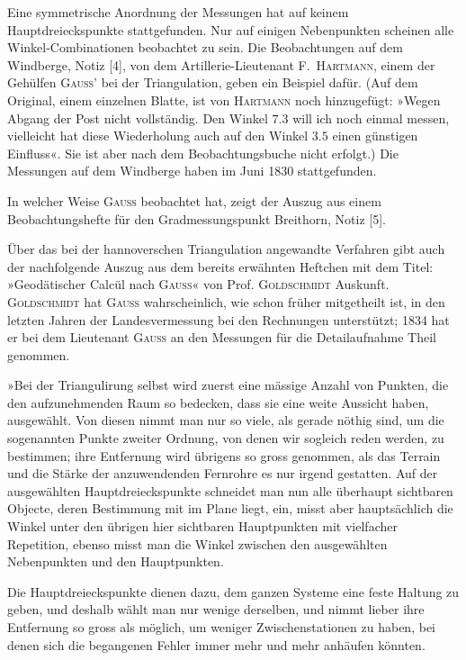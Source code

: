 Eine symmetrische Anordnung der Messungen hat auf keinem Hauptdreieckspunkte stattgefunden. Nur auf einigen Nebenpunkten scheinen alle Winkel-Combinationen beobachtet zu sein. Die Beobachtungen auf dem Windberge, Notiz [4], von dem Artillerie-Lieutenant F.~\textsc{Hartmann}, einem der Gehülfen \textsc{Gauss}' bei der Triangulation, geben ein Beispiel dafür. (Auf dem Original, einem einzelnen Blatte, ist von \textsc{Hartmann} noch hinzugefügt: »Wegen Abgang der Post nicht vollständig. Den Winkel \(7.3\) will ich noch einmal messen, vielleicht hat diese Wiederholung auch auf den Winkel \(3.5\) einen günstigen Einfluss«. Sie ist aber nach dem Beobachtungsbuche nicht erfolgt.) Die Messungen auf dem Windberge haben im Juni 1830 stattgefunden.

In welcher Weise \textsc{Gauss} beobachtet hat, zeigt der Auszug aus einem Beobachtungshefte für den Gradmessungspunkt Breithorn, Notiz [5].

Über das bei der hannoverschen Triangulation angewandte Verfahren gibt auch der nachfolgende Auszug aus dem bereits erwähnten Heftchen mit dem Titel: »Geodätischer Calcül nach \textsc{Gauss}« von Prof. \textsc{Goldschmidt} Auskunft. \textsc{Goldschmidt} hat \textsc{Gauss} wahrscheinlich, wie schon früher mitgetheilt ist, in den letzten Jahren der Landesvermessung bei den Rechnungen unterstützt; 1834 hat er bei dem Lieutenant \textsc{Gauss} an den Messungen für die Detailaufnahme Theil genommen.

»Bei der Triangulirung selbst wird zuerst eine mässige Anzahl von Punkten, die den aufzunehmenden Raum so bedecken, dass sie eine weite Aussicht haben, ausgewählt. Von diesen  nimmt man nur so viele, als gerade nöthig sind, um die sogenannten Punkte zweiter Ordnung, von denen wir sogleich reden werden, zu bestimmen; ihre Entfernung wird übrigens so gross genommen, als das Terrain und die Stärke der anzuwendenden Fernrohre es nur irgend gestatten. Auf  der ausgewählten Hauptdreieckspunkte schneidet man nun alle überhaupt sichtbaren Objecte, deren Bestimmung mit im Plane liegt, ein, misst aber hauptsächlich die Winkel unter den übrigen hier sichtbaren Hauptpunkten mit vielfacher Repetition, ebenso misst man die Winkel zwischen den ausgewählten Nebenpunkten und den Hauptpunkten.

Die Hauptdreieckspunkte dienen dazu, dem ganzen Systeme eine feste Haltung zu geben, und deshalb wählt man nur wenige derselben, und nimmt lieber ihre Entfernung so gross als möglich, um weniger Zwischenstationen zu haben, bei denen sich die begangenen Fehler immer mehr und mehr anhäufen könnten.

